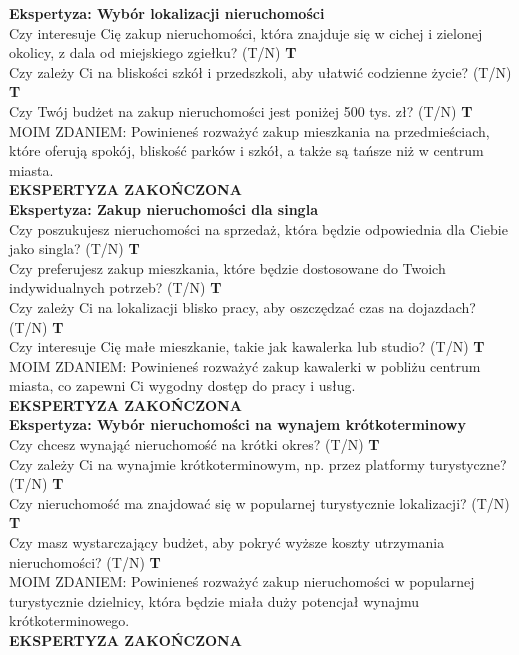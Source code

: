 \noindent \textbf{Ekspertyza: Wybór lokalizacji nieruchomości}\\
\noindent Czy interesuje Cię zakup nieruchomości, która znajduje się w cichej i zielonej okolicy, z dala od miejskiego zgiełku? (T/N) \textbf{T} \\
\noindent Czy zależy Ci na bliskości szkół i przedszkoli, aby ułatwić codzienne życie? (T/N) \textbf{T} \\
\noindent Czy Twój budżet na zakup nieruchomości jest poniżej 500 tys. zł? (T/N) \textbf{T} \\
MOIM ZDANIEM: Powinieneś rozważyć zakup mieszkania na przedmieściach, które oferują spokój, bliskość parków i szkół, a także są tańsze niż w centrum miasta.\\
\textbf{EKSPERTYZA ZAKOŃCZONA}\\

\noindent \textbf{Ekspertyza: Zakup nieruchomości dla singla}\\
\noindent Czy poszukujesz nieruchomości na sprzedaż, która będzie odpowiednia dla Ciebie jako singla? (T/N) \textbf{T} \\
\noindent Czy preferujesz zakup mieszkania, które będzie dostosowane do Twoich indywidualnych potrzeb? (T/N) \textbf{T} \\
\noindent Czy zależy Ci na lokalizacji blisko pracy, aby oszczędzać czas na dojazdach? (T/N) \textbf{T} \\
\noindent Czy interesuje Cię małe mieszkanie, takie jak kawalerka lub studio? (T/N) \textbf{T} \\
MOIM ZDANIEM: Powinieneś rozważyć zakup kawalerki w pobliżu centrum miasta, co zapewni Ci wygodny dostęp do pracy i usług.\\
\textbf{EKSPERTYZA ZAKOŃCZONA}\\

\noindent \textbf{Ekspertyza: Wybór nieruchomości na wynajem krótkoterminowy}\\
\noindent Czy chcesz wynająć nieruchomość na krótki okres? (T/N) \textbf{T} \\
\noindent Czy zależy Ci na wynajmie krótkoterminowym, np. przez platformy turystyczne? (T/N) \textbf{T} \\
\noindent Czy nieruchomość ma znajdować się w popularnej turystycznie lokalizacji? (T/N) \textbf{T} \\
\noindent Czy masz wystarczający budżet, aby pokryć wyższe koszty utrzymania nieruchomości? (T/N) \textbf{T} \\
MOIM ZDANIEM: Powinieneś rozważyć zakup nieruchomości w popularnej turystycznie dzielnicy, która będzie miała duży potencjał wynajmu krótkoterminowego.\\
\textbf{EKSPERTYZA ZAKOŃCZONA}\\

